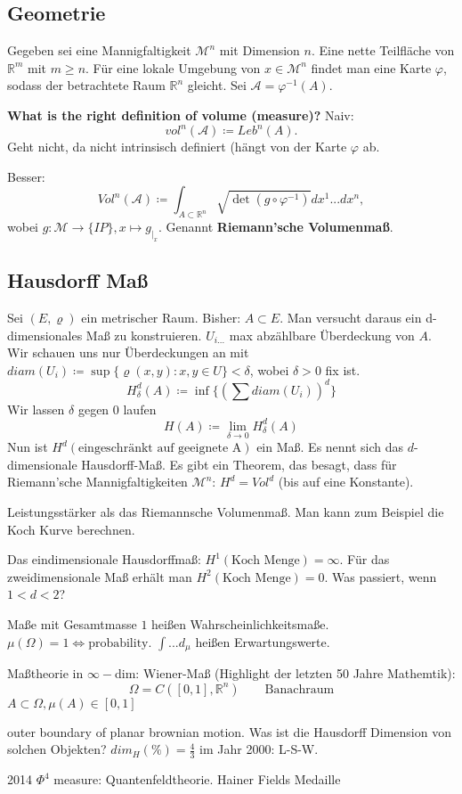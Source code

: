 \documentclass[a4paper, landscape,twocolumn,fontsize=9pt]{scrartcl}
\begin{document}
\subsection{Geometrie}
Gegeben sei eine Mannigfaltigkeit $\mathcal M^n$ mit Dimension $n$. Eine nette Teilfläche von $\mathbb R^m$ mit $m \geq n$. Für eine lokale Umgebung von $x \in \mathcal M^n$ findet man eine Karte $\varphi$, sodass der betrachtete Raum $\mathbb R^n$ gleicht. Sei $\mathcal A = \varphi^{-1}(A)$. 

\textbf{What is the right definition of volume (measure)?}
Naiv: $$vol^n(\mathcal A) \coloneqq Leb^n(A).$$ Geht nicht, da nicht intrinsisch definiert (hängt von der Karte $\varphi$ ab.

Besser: $$Vol^n(\mathcal A) \coloneqq \int_{A \subset \mathbb R^n} \sqrt{\det(g \circ \varphi^{-1})} dx^1...dx^n,$$ wobei $g: \mathcal M \to \{IP\}, x \mapsto g_{\vert_x}$. Genannt \textbf{Riemann'sche Volumenmaß}.


\subsection{Hausdorff Maß}
Sei $(E, \varrho)$ ein metrischer Raum. Bisher: $A \subset E$. Man versucht daraus ein d-dimensionales Maß zu konstruieren. $U_{i...}$ max abzählbare Überdeckung von $A$. Wir schauen uns nur Überdeckungen an mit $diam(U_i) \coloneqq \sup \{ \varrho(x,y): x,y \in U \} < \delta$, wobei $\delta > 0$ fix ist.
\[
	H^d_{\delta}(A) \coloneqq \inf\{ (\sum diam(U_i))^d \}
\]
Wir lassen $\delta$ gegen 0 laufen
\[
	H(A) \coloneqq \lim_{\delta \to 0} H_\delta^d (A)
\]
Nun ist $H^d(\text{eingeschränkt auf geeignete A})$ ein Maß. Es nennt sich das $d$-dimensionale Hausdorff-Maß. Es gibt ein Theorem, das besagt, dass für Riemann'sche Mannigfaltigkeiten $\mathcal M^n$: $H^d = Vol^d$ (bis auf eine Konstante).

Leistungsstärker als das Riemannsche Volumenmaß. Man kann zum Beispiel die Koch Kurve berechnen. \\

\begin{example}{}{}
Das eindimensionale Hausdorffmaß: $H^1(\text{Koch Menge}) = \infty$. Für das zweidimensionale Maß erhält man $H^2(\text{Koch Menge}) = 0$. Was passiert, wenn $1 < d < 2$?	
\end{example}

Maße mit Gesamtmasse $1$ heißen Wahrscheinlichkeitsmaße. $\mu(\Omega) = 1 \iff \text{probability}$. $\int ... d_\mu$ heißen Erwartungswerte.

Maßtheorie in $\infty-$dim: Wiener-Maß (Highlight der letzten 50 Jahre Mathemtik):
\[
	\Omega = C([0,1], \mathbb R^n) \qquad \text{Banachraum}
\]
$A \subset \Omega, \mu(A) \in [0,1]$

outer boundary of planar brownian motion. Was ist die Hausdorff Dimension von solchen Objekten? $dim_H(\%) = \frac{4}{3}$ im Jahr 2000: L-S-W.

2014 $\Phi^4$ measure: Quantenfeldtheorie. Hainer Fields Medaille
\end{document}
